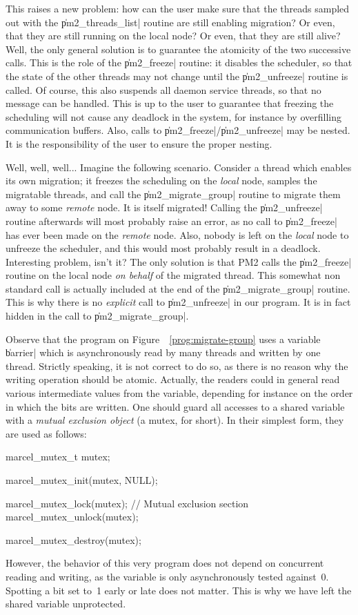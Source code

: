 This raises a new problem: how can the user make sure that the threads
sampled out with the \|pm2_threads_list| routine are still enabling
migration? Or even, that they are still running on the local node? Or
even, that they are still alive? Well, the only general solution is to 
guarantee the atomicity of the two successive calls. This is the role
of the \|pm2_freeze| routine: it disables the scheduler, so that the
state of the other threads may not change until the \|pm2_unfreeze|
routine is called. Of course, this also suspends all daemon service
threads, so that no message can be handled. This is up to the user to
guarantee that freezing the scheduling will not cause any deadlock in
the system, for instance by overfilling communication buffers. Also, 
calls to \|pm2_freeze|/\|pm2_unfreeze| may be nested. It is the
responsibility of the user to ensure the proper nesting.

Well, well, well... Imagine the following scenario. Consider a thread
which enables its own migration; it freezes the scheduling on the
\emph{local} node, samples the migratable threads, and call the
\|pm2_migrate_group| routine to migrate them away to some
\emph{remote} node. It is itself migrated! Calling the \|pm2_unfreeze|
routine afterwards will most probably raise an error, as no call to
\|pm2_freeze| has ever been made on the \emph{remote} node. Also,
nobody is left on the \emph{local} node to unfreeze the scheduler, and
this would most probably result in a deadlock.  Interesting problem,
isn't it? The only solution is that PM2 calls the \|pm2_freeze|
routine on the local node \emph{on behalf} of the migrated thread.
This somewhat non standard call is actually included at the end of the
\|pm2_migrate_group| routine.  This is why there is no \emph{explicit}
call to \|pm2_unfreeze| in our program.  It is in
fact hidden in the call to \|pm2_migrate_group|.

Observe that the program on Figure~~\ref{prog:migrate-group} uses a
variable \|barrier| which is asynchronously read by many threads and
written by one thread. Strictly speaking, it is not correct to do so,
as there is no reason why the writing operation should be
atomic. Actually, the readers could in general read various
intermediate values from the variable, depending for instance on the
order in which the bits are written. One should guard all accesses to
a shared variable with a \emph{mutual exclusion object} (a mutex, for
short). In their simplest form, they are used as follows:
\begin{program}
marcel_mutex_t mutex;

marcel_mutex_init(mutex, NULL);

marcel_mutex_lock(mutex);
// Mutual exclusion section
marcel_mutex_unlock(mutex);

marcel_mutex_destroy(mutex);
\end{program}
However, the behavior of this very program does not depend on
concurrent reading and writing, as the variable is only asynchronously
tested against~0. Spotting a bit set to~1 early or late does not
matter. This is why we have left the shared variable unprotected.

